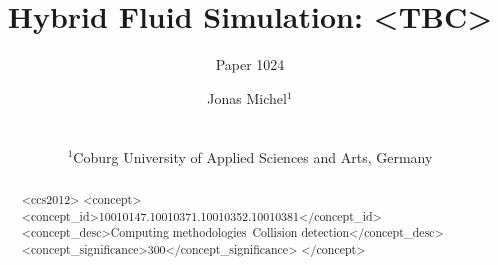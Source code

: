 \documentclass{download/egPublStyle-cgf/egpubl}
\author[Paper 1024]{\parbox{\textwidth}{\centering Paper 1024}}
\author[Michel]
    {\parbox{\textwidth}{\centering 
            Jonas Michel$^1$
            }
            \\
            {
                \parbox{\textwidth}
                {
                    \centering $^1$Coburg University of Applied Sciences and Arts, Germany
                }
            }
    }
\title[Hybrid Fluid Simulation]{Hybrid Fluid Simulation: <TBC>}
\begin{document}
\teaser
{
    
}
\maketitle
\begin{abstract}

\begin{CCSXML}
<ccs2012>
<concept>
<concept_id>10010147.10010371.10010352.10010381</concept_id>
<concept_desc>Computing methodologies~Collision detection</concept_desc>
<concept_significance>300</concept_significance>
</concept>
\end{CCSXML}

\printccsdesc 
\end{abstract}

 


\end{document}
